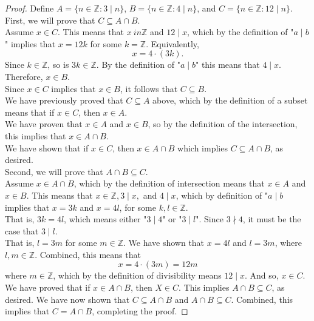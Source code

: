 \documentclass{amsart} %
\theoremstyle{definition} %
\theoremstyle{definition}
\theoremstyle{remark} %
\begin{document}
\begin{proof}
      Define $A = \{n \in \mathbb{Z}:3\mid n \}$, $B = \{n \in \mathbb{Z}:4\mid n \}$, and $C = \{n \in \mathbb{Z}: 12\mid n \}$. \\
      First, we will prove that $C \subseteq A \cap B$. \\
            \indent Assume $x \in C$. This means that $x \ in \mathbb{Z}$ and $12 \mid x$, which by the definition of "$a \mid b$" implies that $x = 12k$ for some $k = \mathbb{Z}$. Equivalently,
              \[ x = 4 \cdot (3k). \]
            \indent Since $k \in \mathbb{Z}$, so is $3k \in \mathbb{Z}$. By the definition of "$a \mid b$" this means that $4 \mid x$. Therefore, $x \in B$. \\
            \indent Since $x \in C$ implies that $x \in B$, it follows that $C \subseteq B$. \\
            \indent We have previously proved that $C \subseteq A$ above, which by the definition of a subset means that if $x \in C$, then $x \in A$. \\
            \indent We have proven that $x \in A$ and $x \in B$, so by the definition of the intersection, this implies that $x \in A \cap B.$ \\
            \indent We have shown that if $x \in C$, then $x \in A \cap B$ which implies $C \subseteq A \cap B$, as desired. \\
      Second, we will prove that $A \cap B \subseteq C$. \\
            \indent Assume $x \in A \cap B$, which by the definition of intersection means that $x \in A$ and $x \in B$. This means that $x \in \mathbb{Z}, 3 \mid x,$ and $4 \mid x$, which by definition of "$a\mid b$ implies that $x = 3k$ and $x = 4l$, for some $k, l \in \mathbb{Z}$. \\
            \indent That is, $3k = 4l$, which means either "$3 \mid 4$" or "$3 \mid l$". Since $3 \nmid 4$, it must be the case that $3 \mid l$.\\
            \indent That is, $l = 3m$ for some $m \in \mathbb{Z}$.
            \indent We have shown that $x = 4l$ and $l = 3m$, where $l,m \in \mathbb{Z}$. Combined, this means that
              \[ x = 4\cdot (3m) = 12m \]
            \indent where $m \in \mathbb{Z}$, which by the definition of divisibility means $12 \mid x$. And so, $x \in C$.
            \indent We have proved that if $x \in A \cap B$, then $X \in C$. This implies $A \cap B \subseteq C$, as desired.
        We have now shown that $C \subseteq A \cap B$ and $A \cap B \subseteq C$. Combined, this implies that $C = A \cap B$, completing the proof.
\end{proof}
\end{document}
